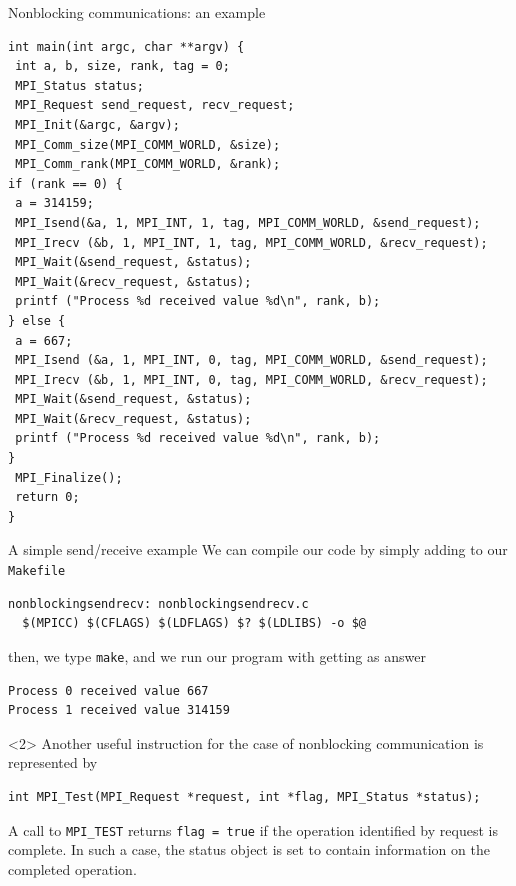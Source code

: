 \documentclass[xcolor={svgnames,usenames}]{beamer}
\begin{document}
\begin{frame}[fragile]{Nonblocking communications: an example}
\scriptsize\vspace{-0.5em}
\begin{verbatim}
int main(int argc, char **argv) {
 int a, b, size, rank, tag = 0; 
 MPI_Status status;
 MPI_Request send_request, recv_request;
 MPI_Init(&argc, &argv);
 MPI_Comm_size(MPI_COMM_WORLD, &size);
 MPI_Comm_rank(MPI_COMM_WORLD, &rank);
if (rank == 0) {
 a = 314159; 
 MPI_Isend(&a, 1, MPI_INT, 1, tag, MPI_COMM_WORLD, &send_request);
 MPI_Irecv (&b, 1, MPI_INT, 1, tag, MPI_COMM_WORLD, &recv_request);
 MPI_Wait(&send_request, &status);
 MPI_Wait(&recv_request, &status);
 printf ("Process %d received value %d\n", rank, b);
} else {
 a = 667;
 MPI_Isend (&a, 1, MPI_INT, 0, tag, MPI_COMM_WORLD, &send_request);
 MPI_Irecv (&b, 1, MPI_INT, 0, tag, MPI_COMM_WORLD, &recv_request);
 MPI_Wait(&send_request, &status);
 MPI_Wait(&recv_request, &status);
 printf ("Process %d received value %d\n", rank, b);
}
 MPI_Finalize();
 return 0;
}
\end{verbatim}

\end{frame}
\begin{frame}[fragile]{A simple send/receive example}
\small
We can compile our code by simply adding to our \texttt{Makefile} 
\begin{verbatim}
nonblockingsendrecv: nonblockingsendrecv.c
  $(MPICC) $(CFLAGS) $(LDFLAGS) $? $(LDLIBS) -o $@
\end{verbatim}
then, we type \texttt{make}, and we run our program with  getting as answer
\begin{verbatim}
Process 0 received value 667
Process 1 received value 314159
\end{verbatim}
\begin{onlyenv}<2>
Another useful instruction for the case of nonblocking communication is represented by 
{\footnotesize
\begin{verbatim}
int MPI_Test(MPI_Request *request, int *flag, MPI_Status *status);
\end{verbatim}
}
A call to \texttt{MPI_TEST} returns \texttt{flag = true} if the operation identified by request is complete.
In such a case, the status object is set to contain information on the completed operation.
\end{onlyenv}

\end{frame}
\end{document}
